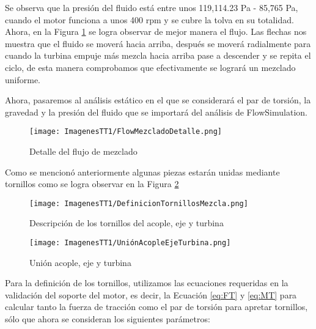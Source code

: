 \documentclass[14pt,oneside]{extarticle} %
\begin{document}
Se observa que la presión del fluido está entre unos 119,114.23 Pa - 85,765 Pa, cuando el motor funciona a unos 400 rpm y se cubre la tolva en su totalidad. Ahora, en la Figura \ref{fig:FlowMezcladoDetalle} se logra observar de mejor manera el flujo. Las flechas nos muestra que el fluido se moverá hacia arriba, después se moverá radialmente para cuando la turbina empuje más mezcla hacia arriba pase a descender y se repita el ciclo, de esta manera comprobamos que efectivamente se logrará un mezclado uniforme.

Ahora, pasaremos al análisis estático en el que se considerará el par de torsión, la gravedad y la presión del fluido que se importará del análisis de FlowSimulation. 

\begin{figure}[H]
    \centering
    \texttt{[image: ImagenesTT1/FlowMezcladoDetalle.png]}
    \caption{Detalle del flujo de mezclado}
    \label{fig:FlowMezcladoDetalle}
\end{figure}

Como se mencionó anteriormente algunas piezas estarán unidas mediante tornillos como se logra observar en la Figura \ref{fig:UniónAcopleEjeTurbina}

\begin{figure}[H]
  \centering
  \begin{minipage}{0.4\textwidth}
    \centering
    \texttt{[image: ImagenesTT1/DefinicionTornillosMezcla.png]}
    \caption{Descripción de los tornillos del acople, eje y turbina}
    \label{fig:DefinicionTornillosMezcla}
  \end{minipage}%
  \begin{minipage}{0.4\textwidth}
    \centering
    \texttt{[image: ImagenesTT1/UniónAcopleEjeTurbina.png]}
    \caption{Unión acople, eje y turbina}
    \label{fig:UniónAcopleEjeTurbina}
  \end{minipage}
\end{figure}

\newpage

Para la definición de los tornillos, utilizamos las ecuaciones requeridas en la validación del soporte del motor, es decir, la Ecuación \ref{eq:FT} y \ref{eq:MT} para calcular tanto la fuerza de tracción como el par de torsión para apretar tornillos, sólo que ahora se consideran los siguientes parámetros:
\end{document}
